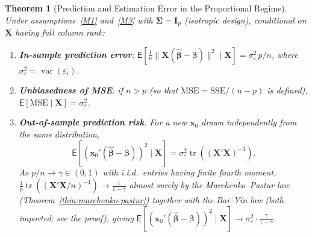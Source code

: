 \documentclass[14pt]{extarticle}
\theoremstyle{plain}
\newtheorem{theorem}{Theorem}[section]
\theoremstyle{definition}
\theoremstyle{remark}
\newcommand\expc{\mathsf{E}}
\DeclareMathOperator\var{var}
\DeclareMathOperator\tr{tr}
\newcommand{\SSE}{\mathrm{SSE}}
\newcommand{\MSE}{\mathrm{MSE}}
\newcommand{\bX}{\mathbf{X}}
\newcommand{\bx}{\mathbf{x}}
\def\bb{\boldsymbol{\beta}}
\newcommand{\bI}{\mathbf{I}}
\newcommand{\bSigma}{\boldsymbol{\Sigma}}
\newcommand{\hbb}{\hat{\boldsymbol{\beta}}}
\begin{document}
\begin{theorem}[Prediction and Estimation Error in the Proportional Regime]\label{thm:proportional-prediction}
Under assumptions~\ref{M1} and~\ref{M3} with $\bSigma = \bI_p$ (isotropic design), conditional on $\bX$ having full column rank:
\begin{enumerate}[label=\textup{(\roman*)}]
\item\label{pp:in} \textbf{In-sample prediction error}: $\expc[\frac{1}{n}\|\bX(\hbb-\bb)\|^2 \mid \bX] = \sigma_\varepsilon^2\,p/n$, where $\sigma_\varepsilon^2 = \var(\varepsilon_i)$.
\item\label{pp:mse} \textbf{Unbiasedness of MSE}: if $n > p$ (so that $\MSE = \SSE/(n-p)$ is defined), $\expc[\MSE \mid \bX] = \sigma_\varepsilon^2$.
\item\label{pp:oos} \textbf{Out-of-sample prediction risk}: For a new $\bx_0$ drawn independently from the same distribution,
\begin{equation}\label{eq:oos-risk}
\expc[(\bx_0'(\hbb-\bb))^2 \mid \bX] = \sigma_\varepsilon^2\tr((\bX'\bX)^{-1}).
\end{equation}
As $p/n \to \gamma \in (0,1)$ with i.i.d.\ entries having finite fourth moment, $\frac{1}{p}\tr((\bX'\bX/n)^{-1}) \to \frac{1}{1-\gamma}$ almost surely by the Marchenko--Pastur law (Theorem~\ref{thm:marchenko-pastur}) together with the Bai--Yin law (both imported; see the proof), giving $\expc[(\bx_0'(\hbb-\bb))^2 \mid \bX] \to \sigma_\varepsilon^2\cdot\frac{\gamma}{1-\gamma}$.
\end{enumerate}
\end{theorem}
\end{document}
